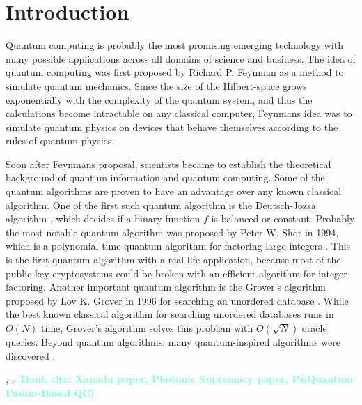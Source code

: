\documentclass[12pt, a4paper,  nobibnotes]{article}
\newcommand{\nd}[1]{\textcolor{Aquamarine}{\textbf{[Dani: #1]}}}
\begin{document}
\section{Introduction}
Quantum computing is probably the most promising emerging technology with many possible applications across
all domains of science and business. The idea of quantum computing was first proposed by Richard P. Feynman
as a method to simulate quantum mechanics. Since the size of the Hilbert-space grows exponentially with
the complexity of the quantum system, and thus the calculations become intractable on any classical
computer, Feynmans idea was to simulate quantum physics on devices that behave themselves according to 
the rules of quantum physics.
\par
Soon after Feynmans proposal, scientists became to establish the theoretical background of quantum
information and quantum computing. Some of the quantum algorithms are proven to have an 
advantage over any known classical algorithm. One of the first such quantum algorithm is 
the Deutsch-Jozsa algorithm \cite{DeutschJozsa1992}, which decides if a binary function $f$ 
is balanced or constant. Probably the most notable quantum algorithm was proposed by Peter W. Shor 
in 1994, which is a polynomial-time quantum algorithm for factoring large integers \cite{Shor1994}.
This is the first quantum algorithm with a real-life application, because most of the public-key
cryptosystems could be broken with an efficient algorithm for integer factoring. 
Another important quantum algorithm is the Grover's algorithm proposed by Lov K. Grover in 1996 for
searching an unordered database \cite{Grover1996}. While the best known classical algorithm 
for searching unordered databases runs in $O(N)$ time, Grover's algorithm solves this problem
with $O(\sqrt N)$ oracle queries. Beyond quantum algorithms, many quantum-inspired algorithms were 
discovered \cite{Tang2019,Ding2019QuantumInspiredSVM,ArrazolaQuantumInspired2019}.

\cite{KLMScheme}, \cite{XanaduBlueprint}, \cite{PsiQuantumFBQC}
\nd{cite: Xanadu paper, Photonic Supremacy paper, PsiQuantum Fusion-Based QC}
\end{document}
